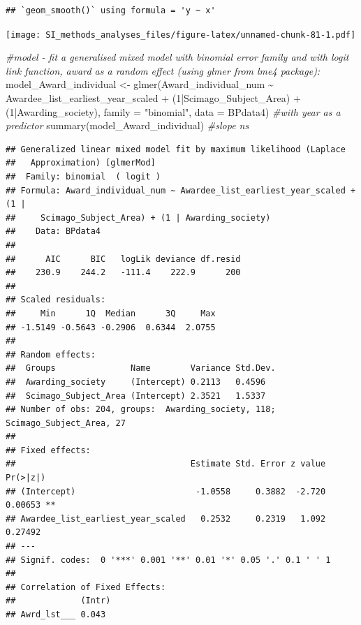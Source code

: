 \documentclass[
]{article}
\newenvironment{Shaded}{\begin{snugshade}}{\end{snugshade}}
\newcommand{\AttributeTok}[1]{\textcolor[rgb]{0.77,0.63,0.00}{#1}}
\newcommand{\CommentTok}[1]{\textcolor[rgb]{0.56,0.35,0.01}{\textit{#1}}}
\newcommand{\DecValTok}[1]{\textcolor[rgb]{0.00,0.00,0.81}{#1}}
\newcommand{\FunctionTok}[1]{\textcolor[rgb]{0.00,0.00,0.00}{#1}}
\newcommand{\NormalTok}[1]{#1}
\newcommand{\OtherTok}[1]{\textcolor[rgb]{0.56,0.35,0.01}{#1}}
\newcommand{\SpecialCharTok}[1]{\textcolor[rgb]{0.00,0.00,0.00}{#1}}
\newcommand{\StringTok}[1]{\textcolor[rgb]{0.31,0.60,0.02}{#1}}
\begin{document}
\begin{verbatim}
## `geom_smooth()` using formula = 'y ~ x'
\end{verbatim}

\texttt{[image: SI\_methods\_analyses\_files/figure-latex/unnamed-chunk-81-1.pdf]}

\begin{Shaded}
\begin{Highlighting}[]
\CommentTok{\#model {-} fit a generalised mixed model with binomial error family and with logit link function, award as a random effect (using glmer from lme4 package):}
\NormalTok{model\_Award\_individual }\OtherTok{\textless{}{-}} \FunctionTok{glmer}\NormalTok{(Award\_individual\_num }\SpecialCharTok{\textasciitilde{}}\NormalTok{ Awardee\_list\_earliest\_year\_scaled }\SpecialCharTok{+}\NormalTok{ (}\DecValTok{1}\SpecialCharTok{|}\NormalTok{Scimago\_Subject\_Area) }\SpecialCharTok{+}\NormalTok{ (}\DecValTok{1}\SpecialCharTok{|}\NormalTok{Awarding\_society), }\AttributeTok{family =} \StringTok{"binomial"}\NormalTok{, }\AttributeTok{data =}\NormalTok{ BPdata4) }\CommentTok{\#with year as a predictor}
\FunctionTok{summary}\NormalTok{(model\_Award\_individual) }\CommentTok{\#slope ns}
\end{Highlighting}
\end{Shaded}

\begin{verbatim}
## Generalized linear mixed model fit by maximum likelihood (Laplace
##   Approximation) [glmerMod]
##  Family: binomial  ( logit )
## Formula: Award_individual_num ~ Awardee_list_earliest_year_scaled + (1 |  
##     Scimago_Subject_Area) + (1 | Awarding_society)
##    Data: BPdata4
## 
##      AIC      BIC   logLik deviance df.resid 
##    230.9    244.2   -111.4    222.9      200 
## 
## Scaled residuals: 
##     Min      1Q  Median      3Q     Max 
## -1.5149 -0.5643 -0.2906  0.6344  2.0755 
## 
## Random effects:
##  Groups               Name        Variance Std.Dev.
##  Awarding_society     (Intercept) 0.2113   0.4596  
##  Scimago_Subject_Area (Intercept) 2.3521   1.5337  
## Number of obs: 204, groups:  Awarding_society, 118; Scimago_Subject_Area, 27
## 
## Fixed effects:
##                                   Estimate Std. Error z value Pr(>|z|)   
## (Intercept)                        -1.0558     0.3882  -2.720  0.00653 **
## Awardee_list_earliest_year_scaled   0.2532     0.2319   1.092  0.27492   
## ---
## Signif. codes:  0 '***' 0.001 '**' 0.01 '*' 0.05 '.' 0.1 ' ' 1
## 
## Correlation of Fixed Effects:
##             (Intr)
## Awrd_lst___ 0.043
\end{verbatim}
\end{document}
